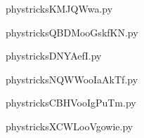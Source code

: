     \newcommand{\CaptionFigKMJQWwa}{<+Type your caption here+>}
    \begin{center}
        
    \end{center}
    phystricksKMJQWwa.py

    

    \clearpage
    


    \newcommand{\CaptionFigQBDMooGskfKN}{<+Type your caption here+>}
    \begin{center}
        
    \end{center}
    phystricksQBDMooGskfKN.py

    

    \clearpage
    


    \newcommand{\CaptionFigDNYAefI}{<+Type your caption here+>}
    \begin{center}
        
    \end{center}
    phystricksDNYAefI.py

    

    \clearpage
    


    \newcommand{\CaptionFigNQWWooIaAkTf}{<+Type your caption here+>}
    \begin{center}
        
    \end{center}
    phystricksNQWWooIaAkTf.py

    

    \clearpage
    


    \newcommand{\CaptionFigCBHVooIgPuTm}{<+Type your caption here+>}
    \begin{center}
        
    \end{center}
    phystricksCBHVooIgPuTm.py

    

    \clearpage
    


    \newcommand{\CaptionFigXCWLooVgowie}{<+Type your caption here+>}
    \begin{center}
        
    \end{center}
    phystricksXCWLooVgowie.py

